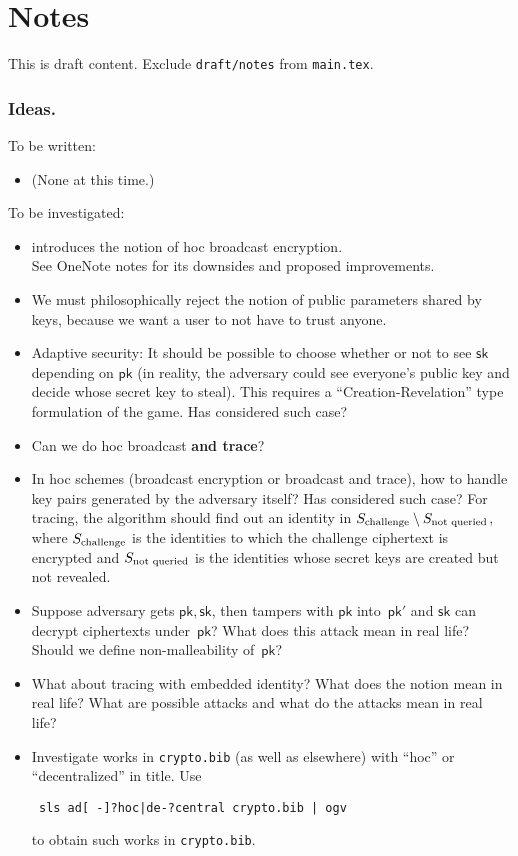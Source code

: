 \section{Notes}

\begingroup
\color{red}
This is draft content.
Exclude \texttt{draft/notes} from \texttt{main.tex}.
\endgroup

\subsubsection{Ideas.}
To be written:
\begin{itemize}
\item (None at this time.)
\end{itemize}
To be investigated:
\begin{itemize}
\item \cite{CCS:WQZD10} introduces the notion of \ad hoc broadcast encryption.\\
See OneNote notes for its downsides and proposed improvements.
\item We must philosophically reject the notion of public parameters shared by keys, because we want a user to not have to trust anyone.
\item Adaptive security: It should be possible to choose whether or not to see $\mathsf{sk}$ depending on $\mathsf{pk}$ (in reality, the adversary could see everyone's public key and decide whose secret key to steal). This requires a ``Creation-Revelation'' type formulation of the game.
Has \cite{CCS:WQZD10} considered such case?
\item Can we do \ad hoc broadcast \textbf{and trace}?
\item In \ad hoc schemes (broadcast encryption or broadcast and trace), how to handle key pairs generated by the adversary itself?
Has \cite{CCS:WQZD10} considered such case?
For tracing, the algorithm should find out an identity in ${S_{\textup{challenge}}}\setminus S_{\textup{not queried}}$, where $S_{\textup{challenge}}$ is the identities to which the challenge ciphertext is encrypted and $S_{\textup{not queried}}$ is the identities whose secret keys are created but not revealed.
\item Suppose adversary gets $\mathsf{pk},\mathsf{sk}$, then tampers with $\mathsf{pk}$ into~$\mathsf{pk}'$ and $\mathsf{sk}$ can decrypt ciphertexts under~$\mathsf{pk}$?
What does this attack mean in real life?
Should we define non-malleability of~$\mathsf{pk}$?
\item What about tracing with embedded identity?
What does the notion mean in real life?
What are possible attacks and what do the attacks mean in real life?
\item Investigate works in \texttt{crypto.bib} (as well as elsewhere) with ``\ad hoc'' or ``decentralized'' in title. Use
\begin{center}\texttt{
sls {\textquotesingle}ad[ -]?hoc|de-?central{\textquotesingle} crypto.bib | ogv
}\end{center}
to obtain such works in \texttt{crypto.bib}.
\end{itemize}
